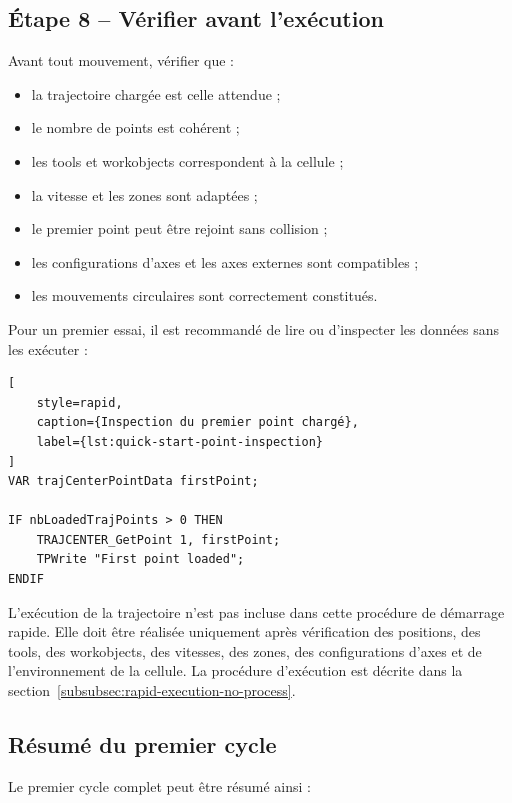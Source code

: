 \documentclass{rapportENSAM}
\begin{document}
\subsection{Étape 8 -- Vérifier avant l'exécution}
\label{subsec:quick-start-execution-check}

Avant tout mouvement, vérifier que :

\begin{itemize}
    \item la trajectoire chargée est celle attendue ;
    \item le nombre de points est cohérent ;
    \item les tools et workobjects correspondent à la cellule ;
    \item la vitesse et les zones sont adaptées ;
    \item le premier point peut être rejoint sans collision ;
    \item les configurations d'axes et les axes externes sont compatibles ;
    \item les mouvements circulaires sont correctement constitués.
\end{itemize}

Pour un premier essai, il est recommandé de lire ou d'inspecter les données
sans les exécuter :

\begin{lstlisting}[
    style=rapid,
    caption={Inspection du premier point chargé},
    label={lst:quick-start-point-inspection}
]
VAR trajCenterPointData firstPoint;

IF nbLoadedTrajPoints > 0 THEN
    TRAJCENTER_GetPoint 1, firstPoint;
    TPWrite "First point loaded";
ENDIF
\end{lstlisting}

L'exécution de la trajectoire n'est pas incluse dans cette procédure de démarrage rapide. Elle doit être réalisée uniquement après vérification des positions, des tools, des workobjects, des vitesses, des zones, des configurations d'axes et de l'environnement de la cellule.
La procédure d'exécution est décrite dans la section~\ref{subsubsec:rapid-execution-no-process}.


\subsection{Résumé du premier cycle}
\label{subsec:quick-start-summary}

Le premier cycle complet peut être résumé ainsi :
\end{document}
